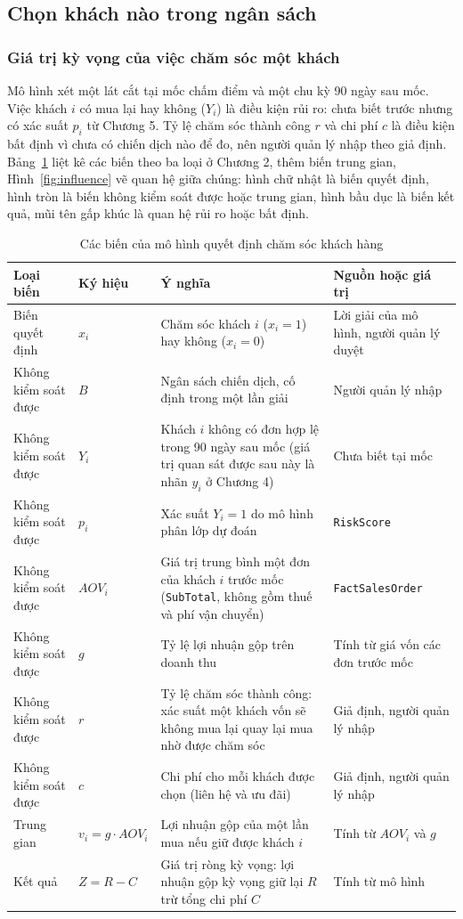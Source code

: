 \subsection{Chọn khách nào trong ngân sách}
\subsubsection{Giá trị kỳ vọng của việc chăm sóc một khách}
Mô hình xét một lát cắt tại mốc chấm điểm và một chu kỳ 90 ngày sau mốc. Việc khách $i$ có mua lại hay không ($Y_i$) là điều kiện rủi ro: chưa biết trước nhưng có xác suất $p_i$ từ Chương 5. Tỷ lệ chăm sóc thành công $r$ và chi phí $c$ là điều kiện bất định vì chưa có chiến dịch nào để đo, nên người quản lý nhập theo giả định. Bảng~\ref{tab:bien} liệt kê các biến theo ba loại ở Chương 2, thêm biến trung gian, Hình~\ref{fig:influence} vẽ quan hệ giữa chúng: hình chữ nhật là biến quyết định, hình tròn là biến không kiểm soát được hoặc trung gian, hình bầu dục là biến kết quả, mũi tên gấp khúc là quan hệ rủi ro hoặc bất định.

\begin{table}[!htbp]
\centering
\caption{Các biến của mô hình quyết định chăm sóc khách hàng}
\label{tab:bien}
\footnotesize
\begin{tabular}{p{2.4cm}p{1.8cm}p{6.2cm}p{3.8cm}}
\toprule
Loại biến & Ký hiệu & Ý nghĩa & Nguồn hoặc giá trị \\
\midrule
Biến quyết định & $x_i$ & Chăm sóc khách $i$ ($x_i=1$) hay không ($x_i=0$) & Lời giải của mô hình, người quản lý duyệt \\
Không kiểm soát được & $B$ & Ngân sách chiến dịch, cố định trong một lần giải & Người quản lý nhập \\
Không kiểm soát được & $Y_i$ & Khách $i$ không có đơn hợp lệ trong 90 ngày sau mốc (giá trị quan sát được sau này là nhãn $y_i$ ở Chương 4) & Chưa biết tại mốc \\
Không kiểm soát được & $p_i$ & Xác suất $Y_i=1$ do mô hình phân lớp dự đoán & \texttt{RiskScore} \\
Không kiểm soát được & $AOV_i$ & Giá trị trung bình một đơn của khách $i$ trước mốc (\texttt{SubTotal}, không gồm thuế và phí vận chuyển) & \texttt{FactSalesOrder} \\
Không kiểm soát được & $g$ & Tỷ lệ lợi nhuận gộp trên doanh thu & Tính từ giá vốn các đơn trước mốc \\
Không kiểm soát được & $r$ & Tỷ lệ chăm sóc thành công: xác suất một khách vốn sẽ không mua lại quay lại mua nhờ được chăm sóc & Giả định, người quản lý nhập \\
Không kiểm soát được & $c$ & Chi phí cho mỗi khách được chọn (liên hệ và ưu đãi) & Giả định, người quản lý nhập \\
Trung gian & $v_i=g\cdot AOV_i$ & Lợi nhuận gộp của một lần mua nếu giữ được khách $i$ & Tính từ $AOV_i$ và $g$ \\
Kết quả & $Z=R-C$ & Giá trị ròng kỳ vọng: lợi nhuận gộp kỳ vọng giữ lại $R$ trừ tổng chi phí $C$ & Tính từ mô hình \\
\bottomrule
\end{tabular}
\end{table}

